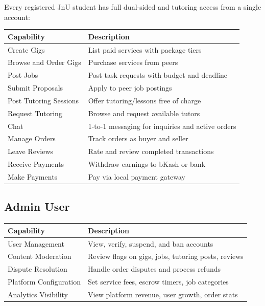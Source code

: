 \documentclass[a4paper,12pt]{article}
\begin{document}
Every registered JnU student has full dual-sided and tutoring access from a single account:

\begin{table}[H]
\centering
\begin{tabular}{|l|p{8cm}|}
\hline
\textbf{Capability} & \textbf{Description} \\
\hline
Create Gigs & List paid services with package tiers \\
Browse and Order Gigs & Purchase services from peers \\
Post Jobs & Post task requests with budget and deadline \\
Submit Proposals & Apply to peer job postings \\
Post Tutoring Sessions & Offer tutoring/lessons free of charge \\
Request Tutoring & Browse and request available tutors \\
Chat & 1-to-1 messaging for inquiries and active orders \\
Manage Orders & Track orders as buyer and seller \\
Leave Reviews & Rate and review completed transactions \\
Receive Payments & Withdraw earnings to bKash or bank \\
Make Payments & Pay via local payment gateway \\
\hline
\end{tabular}
\end{table}

\subsection{Admin User}

\begin{table}[H]
\centering
\begin{tabular}{|l|p{8cm}|}
\hline
\textbf{Capability} & \textbf{Description} \\
\hline
User Management & View, verify, suspend, and ban accounts \\
Content Moderation & Review flags on gigs, jobs, tutoring posts, reviews \\
Dispute Resolution & Handle order disputes and process refunds \\
Platform Configuration & Set service fees, escrow timers, job categories \\
Analytics Visibility & View platform revenue, user growth, order stats \\
\hline
\end{tabular}
\end{table}
\end{document}
